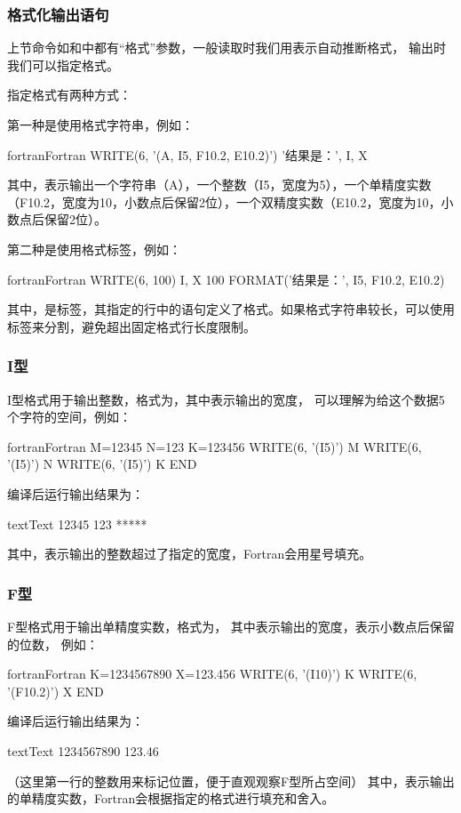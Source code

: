 \subsubsection{格式化输出语句}

上节命令如和中都有“格式”参数，一般读取时我们用\code{*}表示自动推断格式，
输出时我们可以指定格式。

指定格式有两种方式：

第一种是使用格式字符串，例如：
\begin{envcode}{fortran}{Fortran}
      WRITE(6, '(A, I5, F10.2, E10.2)') '结果是：', I, X
\end{envcode}
其中，表示输出一个字符串（A），一个整数（I5，宽度为5），一个单精度实数（F10.2，宽度为10，小数点后保留2位），一个双精度实数（E10.2，宽度为10，小数点后保留2位）。

第二种是使用格式标签，例如：
\begin{envcode}{fortran}{Fortran}
      WRITE(6, 100) I, X
  100 FORMAT('结果是：', I5, F10.2, E10.2)
\end{envcode}
其中，是标签，其指定的行中的语句定义了格式。如果格式字符串较长，可以使用标签来分割，避免超出固定格式行长度限制。

\subsubsection{I型}
I型格式用于输出整数，格式为，其中表示输出的宽度，
可以理解为给这个数据5个字符的空间，例如：
\begin{envcode}{fortran}{Fortran}
      M=12345
      N=123
      K=123456
      WRITE(6, '(I5)') M
      WRITE(6, '(I5)') N
      WRITE(6, '(I5)') K
      END
\end{envcode}
编译后运行输出结果为：
\begin{envcode}{text}{Text}
12345
  123
*****
\end{envcode}
其中，\code{*****}表示输出的整数超过了指定的宽度，Fortran会用星号填充。

\subsubsection{F型}
F型格式用于输出单精度实数，格式为，
其中表示输出的宽度，表示小数点后保留的位数，
例如：
\begin{envcode}{fortran}{Fortran}
      K=1234567890
      X=123.456
      WRITE(6, '(I10)') K
      WRITE(6, '(F10.2)') X
      END
\end{envcode}
编译后运行输出结果为：
\begin{envcode}{text}{Text}
1234567890
    123.46
\end{envcode}
（这里第一行的整数用来标记位置，便于直观观察F型所占空间）
其中，表示输出的单精度实数，Fortran会根据指定的格式进行填充和舍入。

